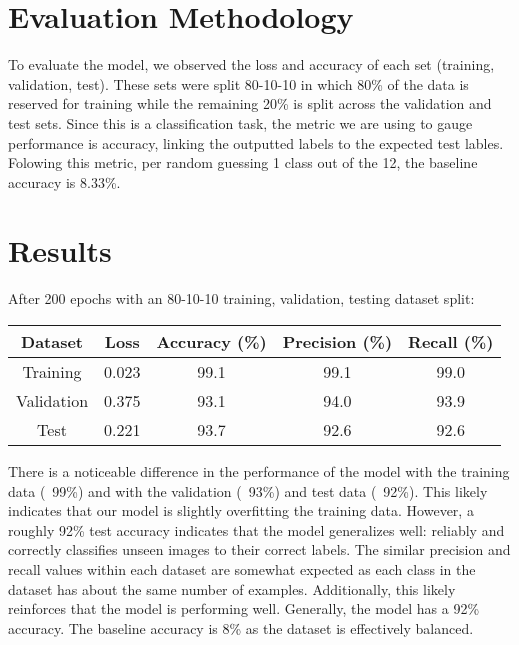 \documentclass[10pt]{article}
\begin{document}
\section{Evaluation Methodology}

\indent To evaluate the model, we observed the loss and accuracy of each set (training, validation, test). These sets were split 80-10-10 in which 80\% of the data is reserved for training while the remaining 20\% is split across the validation and test sets. Since this is a classification task, the metric we are using to gauge performance is accuracy, linking the outputted labels to the expected test lables. Folowing this metric, per random guessing 1 class out of the 12, the baseline accuracy is 8.33\%.




\section{Results}

\indent After 200 epochs with an 80-10-10 training, validation, testing dataset split:
 
\begin{center}
\begin{tabular}{|c c c c c|} 
 \hline
 Dataset & Loss & Accuracy (\%) & Precision (\%) & Recall (\%) \\ 
 \hline
 Training & 0.023 & 99.1 & 99.1 & 99.0 \\ 
 \hline
 Validation & 0.375 & 93.1 & 94.0 & 93.9 \\ 
 \hline
 Test & 0.221 & 93.7 & 92.6 & 92.6 \\ 
\hline
\end{tabular}
\end{center}

\indent There is a noticeable difference in the performance of the model with the training data (~99\%) and with the validation (~93\%) and test data (~92\%). This likely indicates that our model is slightly overfitting the training data. However, a roughly 92\% test accuracy indicates that the model generalizes well: reliably and correctly classifies unseen images to their correct labels. The similar precision and recall values within each dataset are somewhat expected as each class in the dataset has about the same number of examples. Additionally, this likely reinforces that the model is performing well. Generally, the model has a 92\% accuracy. The baseline accuracy is 8\% as the dataset is effectively balanced.
\end{document}
